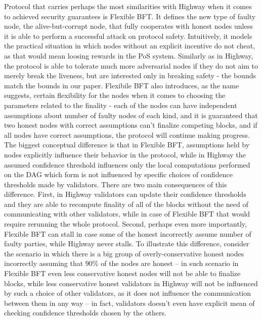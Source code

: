 \documentclass[12pt, fleqn]{article}
\begin{document}
Protocol that carries perhaps the most similarities with Highway when it comes to achieved security guarantees is Flexible BFT\cite{MNR19}.
It defines the new type of faulty node, the alive-but-corrupt node, that fully cooperates with honest nodes unless it is able to perform a successful attack on protocol safety.
Intuitively, it models the practical situation in which nodes without an explicit incentive do not cheat, as that would mean loosing rewards in the PoS system. 
Similarly as in Highway, the protocol is able to tolerate much more adversarial nodes if they do not aim to merely break the liveness, but are interested only in breaking safety - the bounds match the bounds in our paper. 
Flexibile BFT also introduces, as the name suggests, certain flexibility for the nodes when it comes to choosing the parameters related to the finality - each of the nodes can have independent assumptions about number of faulty nodes of each kind, and it is guaranteed that two honest nodes with correct assumptions can't finalize competing blocks, and if all nodes have correct assumptions, the protocol will continue making progress.
The biggest conceptual difference is that in Flexible BFT, assumptions held by nodes explicitly influence their behavior in the protocol, while in Highway the assumed confidence threshold influences only the local computations performed on the DAG which form is not influenced by specific choices of confidence thresholds made by validators. 
There are two main consequences of this difference. First, in Highway validators can update their confidence thresholds and they are able to recompute finality of all of the blocks without the need of communicating with other validators, while in case of Flexible BFT that would require rerunning the whole protocol. 
Second, perhaps even more importantly, Flexible BFT can stall in case some of the honest incorrectly assume number of faulty parties, while Highway never stalls.
To illustrate this difference, consider the scenario in which there is a big group of overly-conservative honest nodes incorrectly assuming that $90\%$ of the nodes are honest -- in such scenario in Flexible BFT even less conservative honest nodes will not be able to finalize blocks, while less conservative honest validators in Highway will not be influenced by such a choice of other validators, as it does not influence the communication between them in any way -- in fact, validators doesn't even have explicit mean of checking confidence thresholds chosen by the others. 

\end{document}
